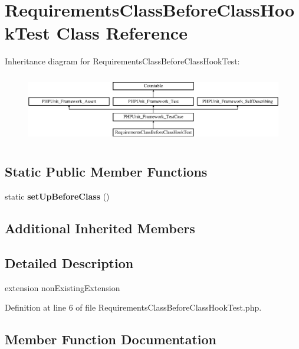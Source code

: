 \section{Requirements\+Class\+Before\+Class\+Hook\+Test Class Reference}
\label{class_requirements_class_before_class_hook_test}
Inheritance diagram for Requirements\+Class\+Before\+Class\+Hook\+Test\+:\begin{figure}[H]
\begin{center}
\leavevmode
\includegraphics[height=3.022942cm]{class_requirements_class_before_class_hook_test}
\end{center}
\end{figure}
\subsection*{Static Public Member Functions}
\begin{DoxyCompactItemize}
\item 
static {\bf set\+Up\+Before\+Class} ()
\end{DoxyCompactItemize}
\subsection*{Additional Inherited Members}


\subsection{Detailed Description}
extension non\+Existing\+Extension 

Definition at line 6 of file Requirements\+Class\+Before\+Class\+Hook\+Test.\+php.



\subsection{Member Function Documentation}
